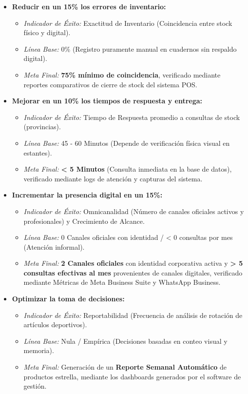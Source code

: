\begin{itemize}
    \item \textbf{Reducir en un 15\% los errores de inventario:} 
    \begin{itemize}
        \item \textit{Indicador de Éxito:} Exactitud de Inventario (Coincidencia entre stock físico y digital).
        \item \textit{Línea Base:} 0\% (Registro puramente manual en cuadernos sin respaldo digital).
        \item \textit{Meta Final:} \textbf{75\% mínimo de coincidencia}, verificado mediante reportes comparativos de cierre de stock del sistema POS.
    \end{itemize}

    \item \textbf{Mejorar en un 10\% los tiempos de respuesta y entrega:} 
    \begin{itemize}
        \item \textit{Indicador de Éxito:} Tiempo de Respuesta promedio a consultas de stock (provincias).
        \item \textit{Línea Base:} 45 - 60 Minutos (Depende de verificación física visual en estantes).
        \item \textit{Meta Final:} \textbf{< 5 Minutos} (Consulta inmediata en la base de datos), verificado mediante logs de atención y capturas del sistema.
    \end{itemize}

    \item \textbf{Incrementar la presencia digital en un 15\%:} 
    \begin{itemize}
        \item \textit{Indicador de Éxito:} Omnicanalidad (Número de canales oficiales activos y profesionales) y Crecimiento de Alcance.
        \item \textit{Línea Base:} 0 Canales oficiales con identidad / < 0 consultas por mes (Atención informal).
        \item \textit{Meta Final:} \textbf{2 Canales oficiales} con identidad corporativa activa y \textbf{> 5 consultas efectivas al mes} provenientes de canales digitales, verificado mediante Métricas de Meta Business Suite y WhatsApp Business.
    \end{itemize}

    \item \textbf{Optimizar la toma de decisiones:} 
    \begin{itemize}
        \item \textit{Indicador de Éxito:} Reportabilidad (Frecuencia de análisis de rotación de artículos deportivos).
        \item \textit{Línea Base:} Nula / Empírica (Decisiones basadas en conteo visual y memoria).
        \item \textit{Meta Final:} Generación de un \textbf{Reporte Semanal Automático} de productos estrella, mediante los dashboards generados por el software de gestión.
    \end{itemize}
\end{itemize}
